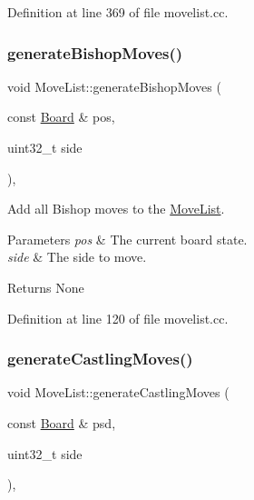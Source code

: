 Definition at line 369 of file movelist.\+cc.

\mbox{\label{classMoveList_a65a2fdca6072299405610f1770dde58e}} 
\subsubsection{\texorpdfstring{generate\+Bishop\+Moves()}{generateBishopMoves()}}
{\footnotesize\ttfamily void Move\+List\+::generate\+Bishop\+Moves (\begin{DoxyParamCaption}\item[{const \mbox{\hyperlink{classBoard}{Board}} \&}]{pos,  }\item[{uint32\+\_\+t}]{side }\end{DoxyParamCaption})\hspace{0.3cm}{\ttfamily [private]}, {\ttfamily [noexcept]}}



Add all Bishop moves to the \mbox{\hyperlink{classMoveList}{Move\+List}}. 


\begin{DoxyParams}{Parameters}
{\em pos} & The current board state. \\
\hline
{\em side} & The side to move. \\
\hline
\end{DoxyParams}
\begin{DoxyReturn}{Returns}
None 
\end{DoxyReturn}


Definition at line 120 of file movelist.\+cc.

\mbox{\label{classMoveList_ae0f3fcb8d21bf22c9e7509308d5fc9fe}} 
\subsubsection{\texorpdfstring{generate\+Castling\+Moves()}{generateCastlingMoves()}}
{\footnotesize\ttfamily void Move\+List\+::generate\+Castling\+Moves (\begin{DoxyParamCaption}\item[{const \mbox{\hyperlink{classBoard}{Board}} \&}]{psd,  }\item[{uint32\+\_\+t}]{side }\end{DoxyParamCaption})\hspace{0.3cm}{\ttfamily [private]}, {\ttfamily [noexcept]}}



